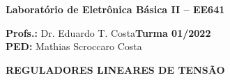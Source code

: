 \documentclass[addpoints]{exam}
\begin{document}
 
\large

\begin{center}
\Large
\textbf{Laboratório de Eletrônica Básica II – EE641}
\end{center}

\large
\vspace{2mm}

\noindent\textbf{Profs.:} Dr. Eduardo T. Costa\hfill \textbf{Turma 01/2022} \\
\textbf{PED:} Mathias Scroccaro Costa \hfill %

\normalsize
 
\vspace{5mm}
 

 
\noindent{}
\hfill
{}

\vspace{5mm}

\noindent{}
\hfill
{}

\vspace{5mm}

\noindent{}
\hfill
{}




\vspace{2mm}


\begin{center}
\large
\textbf{REGULADORES LINEARES DE TENSÃO}
\normalsize
\end{center}
\end{document}
